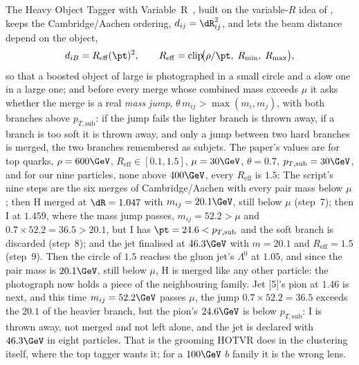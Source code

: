 The Heavy Object Tagger with Variable~R~\cite{Lapsien:2016zor}, built on
the variable-$R$ idea of \cite{Krohn:2009zg}, keeps the Cambridge/Aachen
ordering, $\dij=\dR_{ij}^2$, and lets the beam distance depend on the
object,
\begin{equation}
  \diB=R_{\mathrm{eff}}(\pt)^2,\qquad
  R_{\mathrm{eff}}=\mathrm{clip}\!\big(\rho/\pt,\;R_{\min},\;R_{\max}\big),
  \label{eq:family_photograph:hotvr}
\end{equation}
so that a boosted object of large \pt is photographed in a small circle
and a slow one in a large one; and before every merge whose combined
mass exceeds $\mu$ it asks whether the merge is a real \emph{mass jump},
$\theta\,m_{ij}>\max(m_i,m_j)$, with both branches above $p_{T,\mathrm{sub}}$:
if the jump fails the lighter branch is thrown away, if a branch is too
soft it is thrown away, and only a jump between two hard branches is
merged, the two branches remembered as subjets. The paper's values are
for top quarks, $\rho=600\GeV$, $R_{\mathrm{eff}}\in[0.1,1.5]$,
$\mu=30\GeV$, $\theta=0.7$, $p_{T,\mathrm{sub}}=30\GeV$, and for our
nine particles, none above $400\GeV$, every $R_{\mathrm{eff}}$ is $1.5$:
The script's nine steps are the six merges of Cambridge/Aachen with
every pair mass below $\mu$; then H merged at $\dR=1.047$ with
$m_{ij}=20.1\GeV$, still below $\mu$ (step~7); then I at $1.459$, where
the mass jump passes, $m_{ij}=52.2>\mu$ and $0.7\times52.2=36.5>20.1$, but
I has $\pt=24.6<p_{T,\mathrm{sub}}$ and the soft branch is discarded
(step~8); and the jet finalised at $46.3\GeV$ with $m=20.1$ and
$R_{\mathrm{eff}}=1.5$ (step~9).
Then the circle of $1.5$ reaches the gluon jet's $\Lambda^0$ at
$1.05$, and since the pair mass is $20.1\GeV$, still below $\mu$, H is
merged like any other particle: the photograph now holds a piece of the
neighbouring family. Jet [5]'s pion at $1.46$ is next, and this time
$m_{ij}=52.2\GeV$ passes $\mu$, the jump $0.7\times52.2=36.5$ exceeds the
$20.1$ of the heavier branch, but the pion's $24.6\GeV$ is below
$p_{T,\mathrm{sub}}$: I is thrown away, not merged and not left alone,
and the jet is declared with $46.3\GeV$ in eight particles. That is the
grooming HOTVR does in the clustering itself, where the top tagger wants
it; for a $100\GeV$ $b$ family it is the wrong lens.

